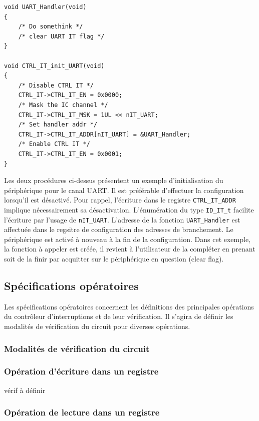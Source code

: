 \begin{lstlisting}[style=CStyle]
void UART_Handler(void)
{
    /* Do somethink */
    /* clear UART IT flag */
}

void CTRL_IT_init_UART(void)
{
    /* Disable CTRL IT */
    CTRL_IT->CTRL_IT_EN = 0x0000;
    /* Mask the IC channel */
    CTRL_IT->CTRL_IT_MSK = 1UL << nIT_UART;
    /* Set handler addr */
    CTRL_IT->CTRL_IT_ADDR[nIT_UART] = &UART_Handler;
    /* Enable CTRL IT */
    CTRL_IT->CTRL_IT_EN = 0x0001;
}
\end{lstlisting}
Les deux procédures ci-dessus présentent un exemple d'initialisation du périphérique pour le canal \gls{UART}.
Il est préférable d'effectuer la configuration lorsqu'il est désactivé.
Pour rappel, l'écriture dans le registre \texttt{CTRL\_IT\_ADDR} implique nécessairement sa désactivation.
L'énumération du type \texttt{ID\_IT\_t} facilite l'écriture par l'usage de \texttt{nIT\_UART}.
L'adresse de la fonction \texttt{UART\_Handler} est affectuée dans le regsitre de configuration des adresses de branchement.
Le périphérique est activé à nouveau à la fin de la configuration.
Dans cet exemple, la fonction à appeler est créée, il revient à l'utilisateur de la compléter en prenant soit de la finir par acquitter sur le périphérique en question (clear flag).

\subsection{Spécifications opératoires}

Les spécifications opératoires concernent les définitions des principales opérations du contrôleur d'interruptions et de leur vérification.
Il s'agira de définir les modalités de vérification du circuit pour diverses opérations.

\subsubsection{Modalités de vérification du circuit}

\subsubsection*{Opération d'écriture dans un registre}

vérif à définir

\subsubsection*{Opération de lecture dans un registre}

